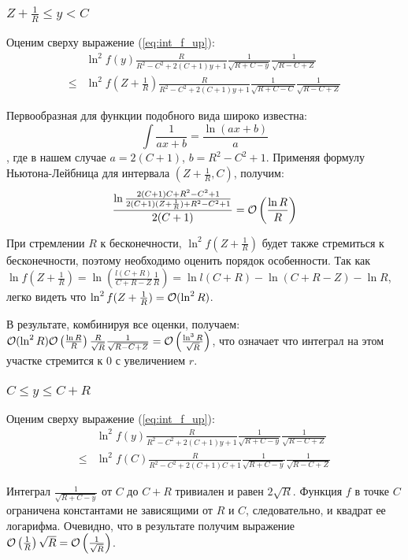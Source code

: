 \subsubsection{$Z + \frac{1}{R} \le y < C$}
Оценим сверху выражение (\ref{eq:int_f_up}):
\begin{align*}
       & \ln^2 f(y) \frac{R}{R^2 - C^2 + 2 (C + 1) y + 1} \frac{1}{\sqrt{R + C - y}} \frac{1}{\sqrt{R - C + Z}}
\\ \le & \ln^2 f(Z + \frac{1}{R}) \frac{R}{R^2 - C^2 + 2 (C + 1) y + 1} \frac{1}{\sqrt{R + C - C}} \frac{1}{\sqrt{R - C + Z}}
\end{align*}

Первообразная для функции подобного вида широко известна:
\[
\int \frac{1}{a x + b} = \frac{\ln (a x + b)}{a}
\]
, где в нашем случае $a = 2 (C + 1)$, $b = R^2 - C^2 + 1$. Применяя формулу Ньютона-Лейбница для интервала $(Z + \frac{1}{R}, C)$, получим:
\[
\frac{\ln \frac{2 (C + 1) C + R^2 - C^2 + 1}{2 (C + 1) (Z + \frac{1}{R}) + R^2 - C^2 + 1}}{2 (C + 1)} = \mathcal{O}\left( \frac{\ln R}{R} \right)
\]

При стремлении $R$ к бесконечности, $\ln^2 f(Z + \frac{1}{R})$ будет также стремиться к бесконечности, поэтому необходимо оценить порядок особенности. Так как $\ln f(Z + \frac{1}{R}) = \ln \left( \frac{l(C + R)}{C + R - Z} \frac{1}{R} \right) = \ln l(C + R) - \ln (C + R - Z) - \ln R$, легко видеть что $\ln^2 f(Z + \frac{1}{R}) = \mathcal{O} (\ln^2 R)$.

В результате, комбинируя все оценки, получаем: $\mathcal{O} (\ln^2 R) \mathcal{O}\left( \frac{\ln R}{R} \right) \frac{R}{\sqrt{R}} \frac{1}{\sqrt{R - C + Z}} = \mathcal{O}\left( \frac{\ln^3 R}{\sqrt{R}} \right)$, что означает что интеграл на этом участке стремится к $0$ с увеличением $r$.

\subsubsection{$C \le y \le C + R$}

Оценим сверху выражение (\ref{eq:int_f_up}):
\begin{align*}
       & \ln^2 f(y) \frac{R}{R^2 - C^2 + 2 (C + 1) y + 1} \frac{1}{\sqrt{R + C - y}} \frac{1}{\sqrt{R - C + Z}}
\\ \le & \ln^2 f(C) \frac{R}{R^2 - C^2 + 2 (C + 1) C + 1} \frac{1}{\sqrt{R + C - y}} \frac{1}{\sqrt{R - C + Z}}
\end{align*}

Интеграл $\frac{1}{\sqrt{R + C - y}}$ от $C$ до $C + R$ тривиален и равен $2 \sqrt{R}$. Функция $f$ в точке $C$ ограничена константами не зависящими от $R$ и $C$, следовательно, и квадрат ее логарифма. Очевидно, что в результате получим выражение $\mathcal{O} \left( \frac{1}{R} \right) \sqrt R = \mathcal{O} \left( \frac{1}{\sqrt{R}} \right)$.

